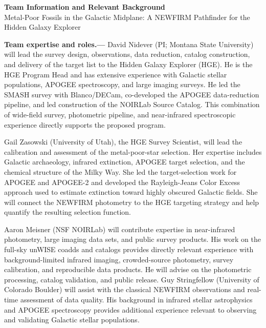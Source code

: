 \documentclass[11pt]{article}
\begin{document}
\begin{center}
{\large\bfseries Team Information and Relevant Background}\\[3pt]
{\normalsize Metal-Poor Fossils in the Galactic Midplane: A NEWFIRM Pathfinder for the Hidden Galaxy Explorer}
\end{center}

\textbf{Team expertise and roles.---}
David Nidever (PI; Montana State University) will lead the survey design,
observations, data reduction, catalog construction, and delivery of the target
list to the Hidden Galaxy Explorer (HGE). He is the HGE Program Head and has
extensive experience with Galactic stellar populations, APOGEE spectroscopy,
and large imaging surveys. He led the SMASH survey with Blanco/DECam,
co-developed the APOGEE data-reduction pipeline, and led construction of the
NOIRLab Source Catalog. This combination of wide-field survey, photometric
pipeline, and near-infrared spectroscopic experience directly supports the
proposed program.

Gail Zasowski (University of Utah), the HGE Survey Scientist, will lead the
calibration and assessment of the metal-poor-star selection. Her expertise
includes Galactic archaeology, infrared extinction, APOGEE target selection,
and the chemical structure of the Milky Way. She led the target-selection work
for APOGEE and APOGEE-2 and developed the Rayleigh-Jeans Color Excess approach
used to estimate extinction toward highly obscured Galactic fields. She will
connect the NEWFIRM photometry to the HGE targeting strategy and help quantify
the resulting selection function.

Aaron Meisner (NSF NOIRLab) will contribute expertise in near-infrared
photometry, large imaging data sets, and public survey products. His work on
the full-sky unWISE coadds and catalogs provides directly relevant experience
with background-limited infrared imaging, crowded-source photometry, survey
calibration, and reproducible data products. He will advise on the photometric
processing, catalog validation, and public release. Guy Stringfellow
(University of Colorado Boulder) will assist with the classical NEWFIRM
observations and real-time assessment of data quality. His background in
infrared stellar astrophysics and APOGEE spectroscopy provides additional
experience relevant to observing and validating Galactic stellar populations.
\end{document}
